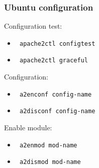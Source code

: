 \begin{frame}[fragile]
        \frametitle{Ubuntu configuration}
Configuration test:
\begin{itemize}
    \item \verb| apache2ctl configtest|
    \item \verb| apache2ctl graceful|
\end{itemize}
Configuration:
\begin{itemize}
    \item \verb| a2enconf config-name|
    \item \verb| a2disconf config-name|
\end{itemize}
Enable module:
\begin{itemize}
    \item \verb| a2enmod mod-name |
    \item \verb| a2dismod mod-name|
\end{itemize}
\end{frame}
